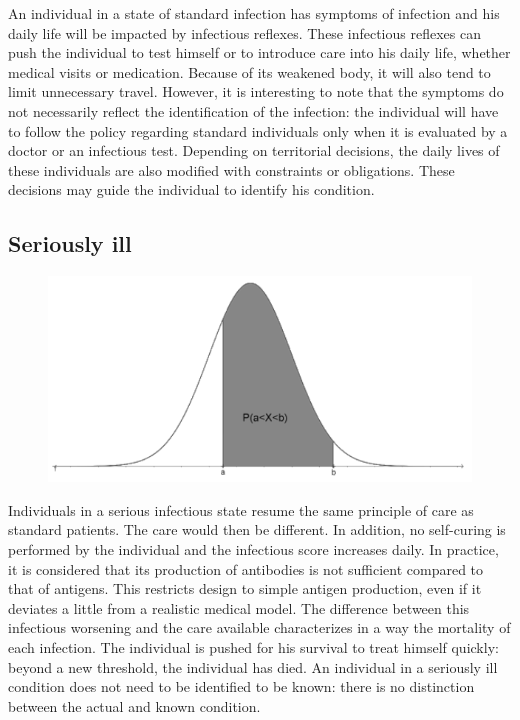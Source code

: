 An individual in a state of standard infection has symptoms of infection and his daily life will be impacted by infectious reflexes. These infectious reflexes can push the individual to test himself or to introduce care into his daily life, whether medical visits or medication. Because of its weakened body, it will also tend to limit unnecessary travel. However, it is interesting to note that the symptoms do not necessarily reflect the identification of the infection: the individual will have to follow the policy regarding standard individuals only when it is evaluated by a doctor or an infectious test. Depending on territorial decisions, the daily lives of these individuals are also modified with constraints or obligations. These decisions may guide the individual to identify his condition.\\

\subsection{Seriously ill}

\begin{figure}
  \centering
  \includegraphics[trim = 384 0 0 0, clip, width=\linewidth]{Media/LoiGauss.png}
\end{figure}

Individuals in a serious infectious state resume the same principle of care as standard patients. The care would then be different. In addition, no self-curing is performed by the individual and the infectious score increases daily. In practice, it is considered that its production of antibodies is not sufficient compared to that of antigens. This restricts design to simple antigen production, even if it deviates a little from a realistic medical model. The difference between this infectious worsening and the care available characterizes in a way the mortality of each infection. The individual is pushed for his survival to treat himself quickly: beyond a new threshold, the individual has died. An individual in a seriously ill condition does not need to be identified to be known: there is no distinction between the actual and known condition.\\

